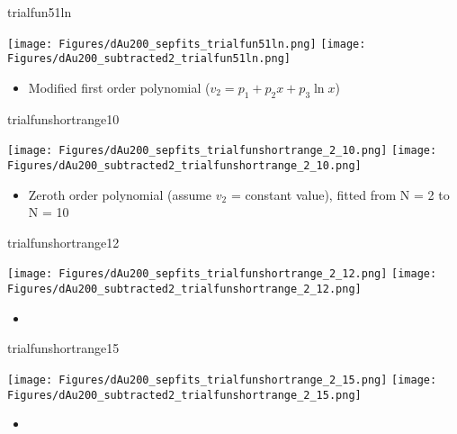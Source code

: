 \documentclass[aspectratio=169,compress,10pt]{beamer}
\begin{document}
\begin{frame}{trialfun51ln}
\begin{center}
\texttt{[image: Figures/dAu200\_sepfits\_trialfun51ln.png]}
\texttt{[image: Figures/dAu200\_subtracted2\_trialfun51ln.png]}
\end{center}
\begin{itemize}
\item Modified first order polynomial ($v_2 = p_1 + p_2x + p_3\ln x$)
\end{itemize}
\end{frame}



\begin{frame}{trialfunshortrange10}
\begin{center}
\texttt{[image: Figures/dAu200\_sepfits\_trialfunshortrange\_2\_10.png]}
\texttt{[image: Figures/dAu200\_subtracted2\_trialfunshortrange\_2\_10.png]}
\end{center}
\begin{itemize}
\item Zeroth order polynomial (assume $v_2$ = constant value), fitted from N = 2 to N = 10
\end{itemize}
\end{frame}



\begin{frame}{trialfunshortrange12}
\begin{center}
\texttt{[image: Figures/dAu200\_sepfits\_trialfunshortrange\_2\_12.png]}
\texttt{[image: Figures/dAu200\_subtracted2\_trialfunshortrange\_2\_12.png]}
\end{center}
\begin{itemize}
\item %
\end{itemize}
\end{frame}



\begin{frame}{trialfunshortrange15}
\begin{center}
\texttt{[image: Figures/dAu200\_sepfits\_trialfunshortrange\_2\_15.png]}
\texttt{[image: Figures/dAu200\_subtracted2\_trialfunshortrange\_2\_15.png]}
\end{center}
\begin{itemize}
\item %
\end{itemize}
\end{frame}
\end{document}
